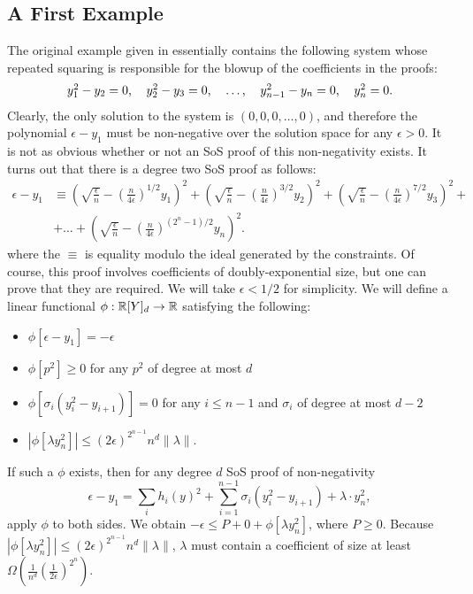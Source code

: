 \subsection{A First Example}
The original example given in \cite{odonnell17} essentially contains the following system whose repeated squaring is responsible for the blowup of the coefficients in the proofs:
\[\begin{tabular}{ccccc}
$y_1^2 - y_2 = 0$, & $y_2^2 - y_3 = 0$, & $\dots$, & $y_{n-1}^2 - y_n = 0$, & $y_n^2 = 0$.
\end{tabular}\]
Clearly, the only solution to the system is $(0,0,0,\dots,0)$, and therefore the polynomial $\epsilon - y_1$ must be non-negative over the solution space for any $\epsilon > 0$. It is not as obvious whether or not an SoS proof of this non-negativity exists. It turns out that there is a degree two SoS proof as follows:
\begin{align}
\epsilon - y_1 &\equiv \left(\sqrt{\frac{\epsilon}{n}} - \left(\frac{n}{4\epsilon}\right)^{1/2}y_1\right)^2 + \left(\sqrt{\frac{\epsilon}{n}} - \left(\frac{n}{4\epsilon}\right)^{3/2}y_2\right)^2 + \left(\sqrt{\frac{\epsilon}{n}} - \left(\frac{n}{4\epsilon}\right)^{7/2}y_3\right)^2 + \nonumber\\
&+\dots + \left(\sqrt{\frac{\epsilon}{n}} - \left(\frac{n}{4\epsilon}\right)^{(2^n-1)/2}y_n\right)^2.\label{eq:proof}\tag{$*$}
\end{align}
%
where the $\equiv$ is equality modulo the ideal generated by the constraints. Of course, this proof involves coefficients of doubly-exponential size, but one can prove that they are required. We will take $\epsilon < 1/2$ for simplicity. We will define a linear functional $\phi: \mathbb R[Y]_d \rightarrow \mathbb R$ satisfying the following:
\begin{itemize}
\item $\phi[\epsilon - y_1] = -\epsilon$
\item $\phi[p^2] \geq 0$ for any $p^2$ of degree at most $d$
\item $\phi[\sigma_i(y_i^2 - y_{i+1})] = 0$ for any $i \leq n-1$ and $\sigma_i$ of degree at most $d-2$
\item $|\phi[\lambda y_n^2]| \leq (2\epsilon)^{2^{n-1}}n^d\|\lambda\|$.
\end{itemize}
If such a $\phi$ exists, then for any degree $d$ SoS proof of non-negativity
\[\epsilon - y_1 = \sum_i h_i(y)^2 + \sum_{i=1}^{n-1} \sigma_i(y_i^2 - y_{i+1}) + \lambda \cdot y_n^2,\]
apply $\phi$ to both sides. We obtain $-\epsilon \leq P + 0 + \phi[\lambda y_n^2]$, where $P \geq 0$. Because $|\phi[\lambda y_n^2]| \leq (2\epsilon)^{2^{n-1}}n^d\|\lambda\|$, $\lambda$ must contain a coefficient of size at least $\Omega(\frac{1}{n^d}\left(\frac{1}{2\epsilon}\right)^{2^n})$.

